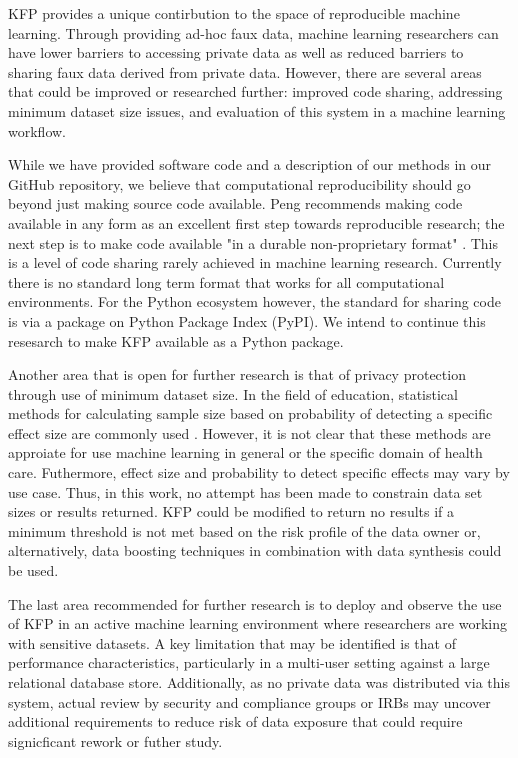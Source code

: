 \documentclass{article}
\begin{document}
KFP provides a unique contirbution to the space of reproducible machine learning. Through providing ad-hoc faux data, machine learning researchers can have lower barriers to accessing private data as well as reduced barriers to sharing faux data derived from private data. However, there are several areas that could be improved or researched further: improved code sharing, addressing minimum dataset size issues, and evaluation of this system in a machine learning workflow.

While we have provided software code and a description of our methods in our GitHub repository, we believe that computational reproducibility should go beyond just making source code available. Peng recommends making code available in any form as an excellent first step towards reproducible research; the next step is to make code available "in a durable non-proprietary format" \cite{peng_reproducible_2011}. This is a level of code sharing rarely achieved in machine learning research. Currently there is no standard long term format that works for all computational environments. For the Python ecosystem however, the standard for sharing code is via a package on Python Package Index (PyPI). We intend to continue this resesarch to make KFP available as a Python package.

Another area that is open for further research is that of privacy protection through use of minimum dataset size. In the field of education, statistical methods for calculating sample size based on probability of detecting a specific effect size are commonly used \cite{naep_2009}. However, it is not clear that these methods are approiate for use machine learning in general or the specific domain of health care. Futhermore, effect size and probability to detect specific effects may vary by use case. Thus, in this work, no attempt has been made to constrain data set sizes or results returned. KFP could be modified to return no results if a minimum threshold is not met based on the risk profile of the data owner or, alternatively, data boosting techniques in combination with data synthesis could be used.

The last area recommended for further research is to deploy and observe the use of KFP in an active machine learning environment where researchers are working with sensitive datasets. A key limitation that may be identified is that of performance characteristics, particularly in a multi-user setting against a large relational database store. Additionally, as no private data was distributed via this system, actual review by security and compliance groups or IRBs may uncover additional requirements to reduce risk of data exposure that could require signicficant rework or futher study.
\end{document}
